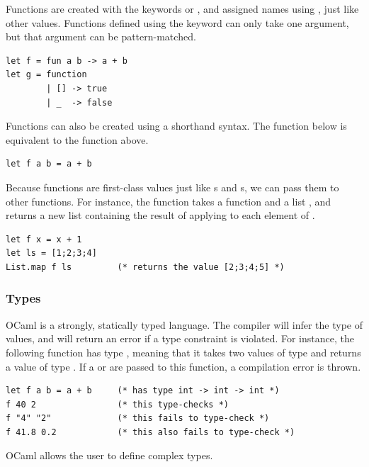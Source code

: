 Functions are created with the keywords  or ,
and assigned names using , just like other values. Functions
defined using the  keyword can only take one argument,
but that argument can be pattern-matched.

\begin{lstlisting}
let f = fun a b -> a + b
let g = function
        | [] -> true
        | _  -> false
\end{lstlisting}

Functions can also be created using a shorthand  syntax. The
function  below is equivalent to the function  above.

\begin{lstlisting}
let f a b = a + b
\end{lstlisting}

Because functions are first-class values just like s and
s, we can pass them to other functions. For instance, the
function  takes a function  and a list
, and returns a new list containing the result of applying
 to each element of .

\begin{lstlisting}
let f x = x + 1
let ls = [1;2;3;4]
List.map f ls         (* returns the value [2;3;4;5] *)
\end{lstlisting}

\subsubsection{Types}

OCaml is a strongly, statically typed language. The compiler will
infer the type of values, and will return an error if a type
constraint is violated. For instance, the following function 
has type , meaning that it takes two values of
type  and returns a value of type . If a
 or  are passed to this function, a
compilation error is thrown.

\begin{lstlisting}
let f a b = a + b     (* has type int -> int -> int *)
f 40 2                (* this type-checks *)
f "4" "2"             (* this fails to type-check *)
f 41.8 0.2            (* this also fails to type-check *)
\end{lstlisting}

OCaml allows the user to define complex types.

